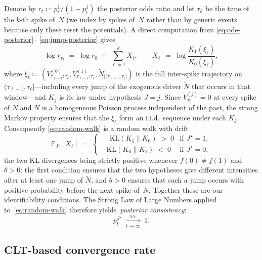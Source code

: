\documentclass[11pt,a4paper]{article}
\theoremstyle{definition}
\newcommand{\E}{\mathbb{E}}
\newcommand{\KL}{\mathrm{KL}}
\begin{document}
Denote by $r_t \coloneqq p_t^1 / (1 - p_t^1)$ the posterior odds ratio
and let $\tau_k$ be the time of the $k$-th spike of~$N$ (we index by
spikes of~$N$ rather than by generic events because only these reset
the potentials). A direct computation from \eqref{eq:ode-posterior}--
\eqref{eq:jump-posterior} gives
\begin{equation}
    \log r_{\tau_k} \;=\; \log r_0 \;+\; \sum_{\ell=1}^{k} X_\ell,
    \qquad
    X_\ell \;\coloneqq\; \log \frac{K_1(\xi_\ell)}{K_0(\xi_\ell)},
    \label{eq:random-walk}
\end{equation}
where
$\xi_\ell \coloneqq (V^{(0)}_{\tau_{\ell-1}:\tau_\ell},
V^{(1)}_{\tau_{\ell-1}:\tau_\ell},
\widetilde N_{|(\tau_{\ell-1},\tau_\ell]})$ is the full inter-spike
trajectory on $(\tau_{\ell-1}, \tau_\ell]$---including every jump of the
exogenous driver $\widetilde N$ that occurs in that window---and $K_j$
is its law under hypothesis $J = j$. Since $V^{(j)}_{\tau_\ell} = 0$ at
every spike of $N$ and $\widetilde N$ is a homogeneous Poisson process
independent of the past, the strong Markov property ensures that the
$\xi_\ell$ form an i.i.d.\ sequence under each $K_j$. Consequently
\eqref{eq:random-walk} is a random walk with drift
\begin{equation}
    \E_{J^\star}[X_\ell] \;=\; \begin{cases}
        \phantom{-}\KL(K_1 \| K_0) \;>\; 0 & \text{if } J^\star = 1, \\
        -\KL(K_0 \| K_1) \;<\; 0 & \text{if } J^\star = 0,
    \end{cases}
\end{equation}
the two KL divergences being strictly positive whenever $f(0) \neq
f(1)$ and $\theta > 0$: the first condition ensures that the two
hypotheses give different intensities after at least one jump of
$\widetilde N$, and $\theta > 0$ ensures that such a jump occurs with
positive probability before the next spike of~$N$. Together these are
our identifiability conditions.
The Strong Law of Large Numbers applied
to~\eqref{eq:random-walk} therefore yields~\emph{posterior consistency}:
\begin{equation}
    p_t^{J^\star} \;\xrightarrow[t \to \infty]{\mathrm{a.s.}} \; 1.
    \label{eq:consistency}
\end{equation}

\subsection{CLT-based convergence rate}
\label{subsec:clt}
\end{document}
